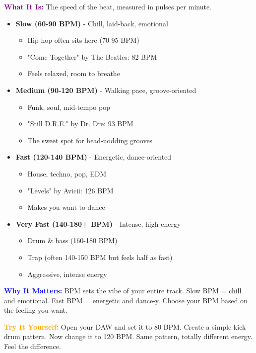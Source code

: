 \documentclass[11pt,letterpaper]{article}
\newcommand{\purple}[1]{\textcolor{purple}{\textbf{#1}}}
\newcommand{\bluepurple}[1]{\textcolor{blue}{\textbf{#1}}}
\newcommand{\orangetext}[1]{\textcolor{orange}{\textbf{#1}}}
\begin{document}
\textbf{\purple{What It Is:}} The speed of the beat, measured in pulses per minute.

\begin{itemize}[leftmargin=*]
\item \textbf{Slow (60-90 BPM)} - Chill, laid-back, emotional
  \begin{itemize}
  \item Hip-hop often sits here (70-95 BPM)
  \item "Come Together" by The Beatles: 82 BPM
  \item Feels relaxed, room to breathe
  \end{itemize}

\item \textbf{Medium (90-120 BPM)} - Walking pace, groove-oriented
  \begin{itemize}
  \item Funk, soul, mid-tempo pop
  \item "Still D.R.E." by Dr. Dre: 93 BPM
  \item The sweet spot for head-nodding grooves
  \end{itemize}

\item \textbf{Fast (120-140 BPM)} - Energetic, dance-oriented
  \begin{itemize}
  \item House, techno, pop, EDM
  \item "Levels" by Avicii: 126 BPM
  \item Makes you want to dance
  \end{itemize}

\item \textbf{Very Fast (140-180+ BPM)} - Intense, high-energy
  \begin{itemize}
  \item Drum \& bass (160-180 BPM)
  \item Trap (often 140-150 BPM but feels half as fast)
  \item Aggressive, intense energy
  \end{itemize}
\end{itemize}

\textbf{\bluepurple{Why It Matters:}} BPM sets the vibe of your entire track. Slow BPM = chill and emotional. Fast BPM = energetic and dance-y. Choose your BPM based on the feeling you want.

\textbf{\orangetext{Try It Yourself:}} Open your DAW and set it to 80 BPM. Create a simple kick drum pattern. Now change it to 120 BPM. Same pattern, totally different energy. Feel the difference.
\end{document}
